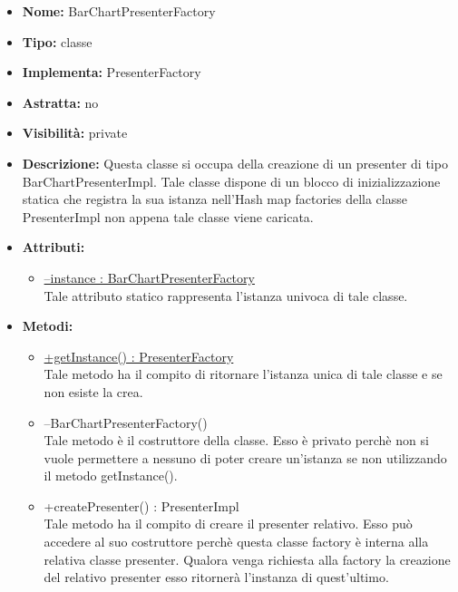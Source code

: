 			
			\begin{itemize}
			\item \textbf{Nome:} BarChartPresenterFactory
			\item \textbf{Tipo:} classe
			
		\item \textbf{Implementa:}
		PresenterFactory
		\item \textbf{Astratta:}
		no
			\item \textbf{Visibilità:} private
			\item \textbf{Descrizione:} Questa classe si occupa della creazione di un presenter di tipo BarChartPresenterImpl. Tale classe dispone di un blocco di inizializzazione statica che registra la sua istanza nell'Hash map factories della classe PresenterImpl non appena tale classe viene caricata.
			\item \textbf{Attributi:}
				\begin{itemize}
				\setlength{\itemsep}{5pt}
				
					\item[\ding{111}] \underline{--instance : BarChartPresenterFactory} \\ [1mm] Tale attributo statico rappresenta l'istanza univoca di tale classe.
				\end{itemize}
		
			\item \textbf{Metodi:}
				\begin{itemize}
				\setlength{\itemsep}{5pt}
				
					\item[\ding{111}] {\underline{+getInstance() : PresenterFactory}} \\ [1mm] Tale metodo ha il compito di ritornare l'istanza unica di tale classe e se non esiste la crea.
					\item[\ding{111}] {{--BarChartPresenterFactory()}} \\ [1mm] Tale metodo è il costruttore della classe. Esso è privato perchè non si vuole permettere a nessuno di poter creare un'istanza se non utilizzando il metodo getInstance().
					\item[\ding{111}] {{+createPresenter() : PresenterImpl}} \\ [1mm] Tale metodo ha il compito di creare il presenter relativo. Esso può accedere al suo costruttore perchè questa classe factory è interna alla relativa classe presenter. Qualora venga richiesta alla factory la creazione del relativo presenter esso ritornerà l'instanza di quest'ultimo.
				\end{itemize}
		
			\end{itemize}

